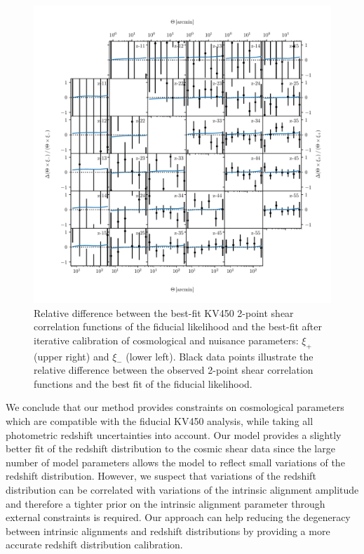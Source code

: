 \documentclass{aa}
\begin{document}
\begin{figure}
\centering
\includegraphics[width=\linewidth]{plots/correlation_function.pdf}
\caption{Relative difference between the best-fit KV450 2-point shear correlation functions of the fiducial likelihood and the best-fit after iterative calibration of cosmological and nuisance parameters: $\xi_+$ (upper right) and $\xi_-$ (lower left). Black data points illustrate the relative difference between the observed 2-point shear correlation functions and the best fit of the fiducial likelihood.}
\label{fig:correlation_function}
\end{figure}

We conclude that our method provides constraints on cosmological parameters which are compatible with the fiducial KV450 analysis, while taking all photometric redshift uncertainties into account. Our model provides a slightly better fit of the redshift distribution to the cosmic shear data since the large number of model parameters allows the model to reflect small variations of the redshift distribution. However, we suspect that variations of the redshift distribution can be correlated with variations of the intrinsic alignment amplitude and therefore a tighter prior on the intrinsic alignment parameter through external constraints is required. Our approach can help reducing the degeneracy between intrinsic alignments and redshift distributions by providing a more accurate redshift distribution calibration.
\end{document}
